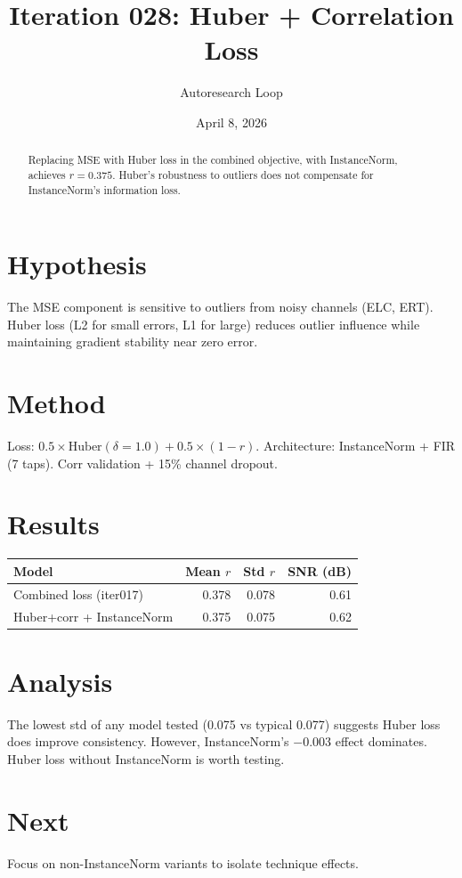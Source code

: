 \documentclass[11pt,a4paper]{article}
\title{Iteration 028: Huber + Correlation Loss}
\author{Autoresearch Loop}
\date{April 8, 2026}
\begin{document}
\maketitle

\begin{abstract}
Replacing MSE with Huber loss in the combined objective, with InstanceNorm,
achieves $r=0.375$. Huber's robustness to outliers does not compensate for
InstanceNorm's information loss.
\end{abstract}

\section{Hypothesis}
The MSE component is sensitive to outliers from noisy channels (ELC, ERT).
Huber loss (L2 for small errors, L1 for large) reduces outlier influence
while maintaining gradient stability near zero error.

\section{Method}
Loss: $0.5 \times \text{Huber}(\delta=1.0) + 0.5 \times (1-r)$. Architecture:
InstanceNorm + FIR (7 taps). Corr validation + 15\% channel dropout.

\section{Results}
\begin{table}[H]
\centering
\begin{tabular}{lrrr}
\toprule
Model & Mean $r$ & Std $r$ & SNR (dB) \\
\midrule
Combined loss (iter017) & 0.378 & 0.078 & 0.61 \\
Huber+corr + InstanceNorm & 0.375 & 0.075 & 0.62 \\
\bottomrule
\end{tabular}
\end{table}

\section{Analysis}
The lowest std of any model tested (0.075 vs typical 0.077) suggests Huber
loss does improve consistency. However, InstanceNorm's $-$0.003 effect
dominates. Huber loss without InstanceNorm is worth testing.

\section{Next}
Focus on non-InstanceNorm variants to isolate technique effects.
\end{document}
